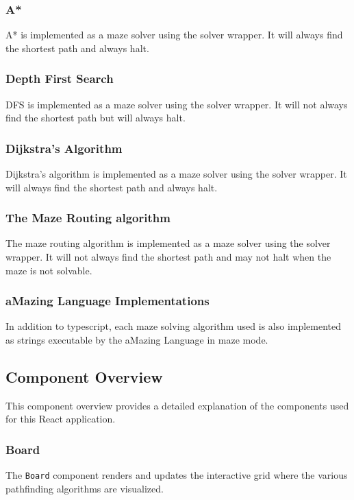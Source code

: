 \subsubsection{A*}

A* \cite{a-star-alg} is implemented as a maze solver using the solver wrapper. It will always find the shortest path and always halt.

\subsubsection{Depth First Search}

DFS \cite{pkd} is implemented as a maze solver using the solver wrapper. It will not always find the shortest path but will always halt.

\subsubsection{Dijkstra's Algorithm}

Dijkstra's algorithm \cite{dijkstras-alg} is implemented as a maze solver using the solver wrapper. It will always find the shortest path and always halt.

\subsubsection{The Maze Routing algorithm}

The maze routing algorithm \cite{maze-routing-alg} is implemented as a maze solver using the solver wrapper. It will not always find the shortest path and may not halt when the maze is not solvable.

\subsubsection{aMazing Language Implementations}

In addition to typescript, each maze solving algorithm used is also implemented as strings executable by the aMazing Language in maze mode.

\subsection{Component Overview}
This component overview provides a detailed explanation of the components used for this React application.

\subsubsection{Board}
The \texttt{Board} component renders and updates the interactive grid where the various pathfinding algorithms are visualized.

